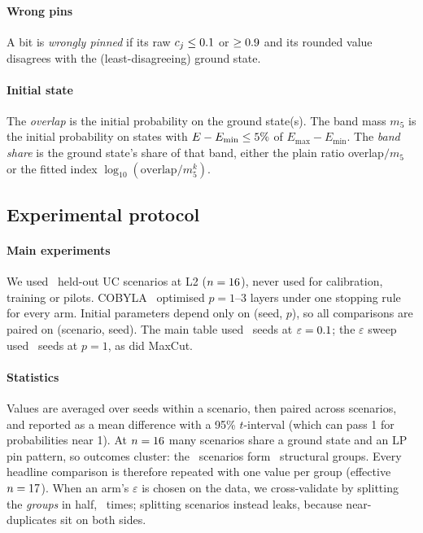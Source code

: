 \paragraph{Wrong pins} A bit is \emph{wrongly pinned} if its raw $c_j\leq0.1$ or $\geq0.9$ and its rounded value disagrees with the (least-disagreeing) ground state.

\paragraph{Initial state} The \emph{overlap} is the initial probability on the ground state(s). The band mass $m_5$ is the initial probability on states with $E-E_{\min}\leq5\%$ of $E_{\max}-E_{\min}$. The \emph{band share} is the ground state's share of that band, either the plain ratio overlap$/m_5$ or the fitted index $\log_{10}(\mathrm{overlap}/m_5^{k})$.

\subsection{Experimental protocol}
\label{sec:protocol}

\paragraph{Main experiments} We used \NScen\ held-out UC scenarios at L2 ($n=16$), never used for calibration, training or pilots. COBYLA~\cite{powell1994cobyla} optimised $p=1$--3 layers under one stopping rule for every arm. Initial parameters depend only on (seed, $p$), so all comparisons are paired on (scenario, seed). The main table used \NSeedsMain\ seeds at $\varepsilon=0.1$; the $\varepsilon$ sweep used \NSeedsSweep\ seeds at $p=1$, as did MaxCut.

\paragraph{Statistics} Values are averaged over seeds within a scenario, then paired across scenarios, and reported as a mean difference with a 95\% $t$-interval (which can pass 1 for probabilities near 1). At $n=16$ many scenarios share a ground state and an LP pin pattern, so outcomes cluster: the \NScen\ scenarios form \NGroupsGL\ structural groups. Every headline comparison is therefore repeated with one value per group (effective $n=17$). When an arm's $\varepsilon$ is chosen on the data, we cross-validate by splitting the \emph{groups} in half, \NSplits\ times; splitting scenarios instead leaks, because near-duplicates sit on both sides.

